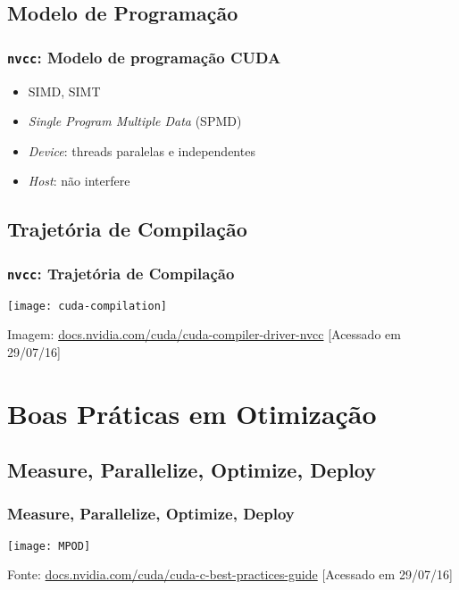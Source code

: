 \documentclass[10pt, compress]{beamer}
\begin{document}
\subsection{Modelo de Programação}

\begin{frame}
    \frametitle{\texttt{nvcc}: Modelo de programação CUDA}
    \begin{itemize}
        \item SIMD, SIMT
        \item \textit{Single Program Multiple Data} (SPMD)
        \item \textit{Device}: \alert{threads} paralelas e \alert{independentes}
        \item \textit{Host}: não interfere
    \end{itemize}
\end{frame}

\subsection{Trajetória de Compilação}

\begin{frame}
    \frametitle{\texttt{nvcc}: Trajetória de Compilação}
    \centering
    \texttt{[image: cuda-compilation]}
    \vfill

    \begin{center}
        \tiny{Imagem: \url{docs.nvidia.com/cuda/cuda-compiler-driver-nvcc} [Acessado em 29/07/16]}
    \end{center}
\end{frame}

\section{Boas Práticas em Otimização}

\subsection{Measure, Parallelize, Optimize, Deploy}

\begin{frame}
    \frametitle{Measure, Parallelize, Optimize, Deploy}
    \centering
    \texttt{[image: MPOD]}
    \vfill

    \begin{center}
        \tiny{Fonte: \url{docs.nvidia.com/cuda/cuda-c-best-practices-guide} [Acessado em 29/07/16]}
    \end{center}
\end{frame}
\end{document}
